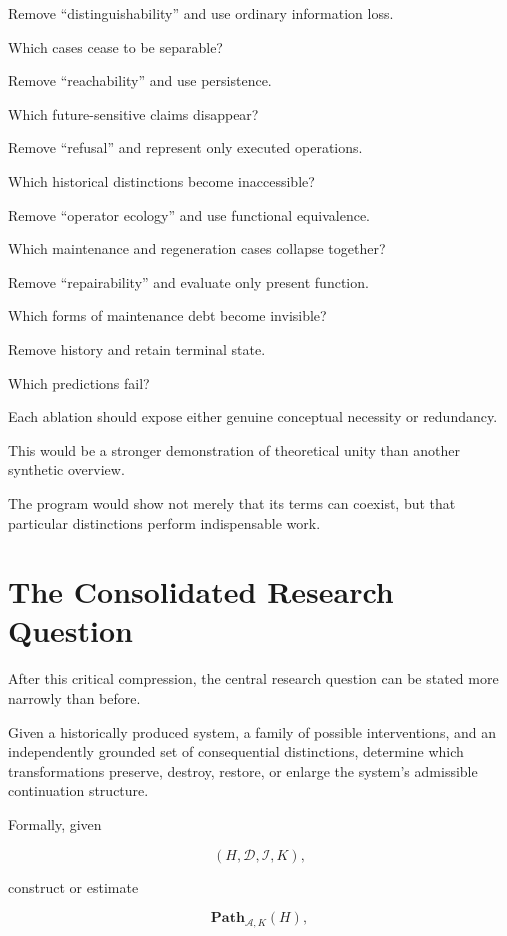 \documentclass[11pt]{article}
\theoremstyle{remark}
\newcommand{\Adm}{\mathcal{A}}
\begin{document}
Remove ``distinguishability'' and use ordinary information loss.

Which cases cease to be separable?

Remove ``reachability'' and use persistence.

Which future-sensitive claims disappear?

Remove ``refusal'' and represent only executed operations.

Which historical distinctions become inaccessible?

Remove ``operator ecology'' and use functional equivalence.

Which maintenance and regeneration cases collapse together?

Remove ``repairability'' and evaluate only present function.

Which forms of maintenance debt become invisible?

Remove history and retain terminal state.

Which predictions fail?

Each ablation should expose either genuine conceptual necessity or redundancy.

This would be a stronger demonstration of theoretical unity than another synthetic overview.

The program would show not merely that its terms can coexist, but that particular distinctions perform indispensable work.

\section{The Consolidated Research Question}

After this critical compression, the central research question can be stated more narrowly than before.

Given a historically produced system, a family of possible interventions, and an independently grounded set of consequential distinctions, determine which transformations preserve, destroy, restore, or enlarge the system's admissible continuation structure.

Formally, given

\begin{equation}
(H,\mathcal{D},\mathcal{I},K),
\end{equation}

construct or estimate

\begin{equation}
\mathbf{Path}_{\Adm,K}(H),
\end{equation}
\end{document}
